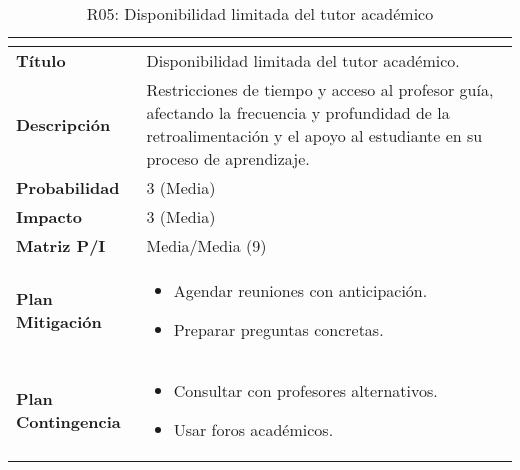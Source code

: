 \begin{table}[H]
\centering
\begin{tabular}{|>{\bfseries}l|p{10cm}|}
\hline
\rowcolor{lightgray}
\multicolumn{2}{|c|}{\textbf{Riesgo R05}} \\ \hline
Título & Disponibilidad limitada del tutor académico.\\ \hline
Descripción & Restricciones de tiempo y acceso al profesor guía, afectando la frecuencia y profundidad de la retroalimentación y el apoyo al estudiante en su proceso de aprendizaje. \\ \hline
Probabilidad & 3 (Media) \\ \hline
Impacto & 3 (Media) \\ \hline
Matriz P/I & Media/Media (9)\\ \hline
Plan Mitigación & 
\begin{itemize}
\item Agendar reuniones con anticipación.
\item Preparar preguntas concretas.
\end{itemize} \\ \hline
Plan Contingencia & 
\begin{itemize}
\item Consultar con profesores alternativos.
\item Usar foros académicos.
\end{itemize} \\ \hline
\end{tabular}
\caption{R05: Disponibilidad limitada del tutor académico}
\label{tab:R05}
\end{table}

